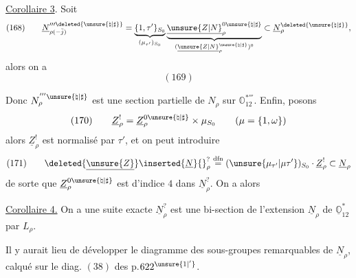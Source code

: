 \uline{Corollaire 3}. Soit
\[
(168)\qquad
\underline N_{\rho(-\bar j)}^{\prime\prime\prime\deleted{\unsure{\natural|\sharp}}}
=\underbrace{\{1,\tau'\}_{S_0}}_{(\mu_{\tau'})_{S_0}}
\underbrace{\underline{\unsure{Z|N}}_\rho^{0\unsure{\natural|\sharp}}}_{(\underline{\unsure{Z|N}}_\rho^{\unsure{\natural|\sharp}})^0}
\subset\underline N_\rho^{\deleted{\unsure{\natural|\sharp}}},
\]
alors on a
\[
(169)
\]

Donc \(N_\rho^{'''\unsure{\natural|\sharp}}\) est une section partielle de \(N_\rho\)
sur \(\mathbb O_{12}^{*'''}\). Enfin, posons
\[
(170)\qquad
\underline Z_\rho^{!}
=\underline Z_\rho^{0\unsure{\natural|\sharp}}\times\mu_{S_0}
\qquad(\mu=\{1,\omega\})
\]
alors \(\underline Z_\rho^!\) est normalisé par \(\tau'\), et
on peut introduire
\[
(171)\qquad
\deleted{\underline{\unsure{Z}}}\inserted{\underline N}{}_\rho^{?}
\mathrel{\overset{\mathrm{dfn}}{=}}
(\unsure{\mu_{\tau'}|\mu\tau'})_{S_0}\cdot\underline Z_\rho^!
\subset\underline N_\rho
\]
de sorte que \(\underline Z_\rho^{0\unsure{\natural|\sharp}}\) est d'indice \(4\)
dans \(\underline N_\rho^{?}\). On a alors

\uline{Corollaire 4.} On a une suite exacte
\(\underline N_\rho^{?}\) est une bi-section de l'extension
\(\underline N_\rho\) de \(\underline{\mathbb O}_{12}^{*}\) par \(L_\rho\).

Il y aurait lieu de développer le diagramme des sous-groupes
remarquables de \(\underline N_\rho\), calqué sur
le diag. \((38)\) des p.\(622^{\unsure{1|'}}\).

